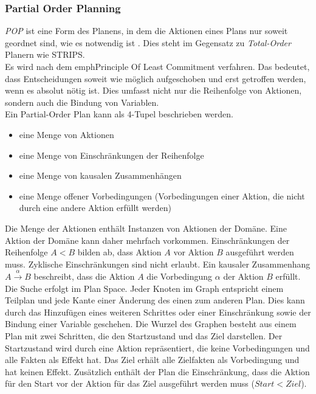 \subsubsection{Partial Order Planning}{\label{section:pop}}
\emph{\ac{POP}} ist eine Form des Planens, in dem die Aktionen eines Plans nur soweit geordnet sind, wie es notwendig ist \cite{dyer_2003}.
Dies steht im Gegensatz zu \emph{Total-Order} Planern wie \ac{STRIPS}.\\
Es wird nach dem emph{Principle Of Least Commitment} verfahren.
Das bedeutet, dass Entscheidungen soweit wie möglich aufgeschoben und erst getroffen werden, wenn es absolut nötig ist.
Dies umfasst nicht nur die Reihenfolge von Aktionen, sondern auch die Bindung von Variablen.\\
Ein Partial-Order Plan kann als 4-Tupel \cite{grastien} beschrieben werden.
\begin{itemize}
    \item eine Menge von Aktionen
    \item eine Menge von Einschränkungen der Reihenfolge
    \item eine Menge von kausalen Zusammenhängen
    \item eine Menge offener Vorbedingungen (Vorbedingungen einer Aktion, die nicht durch eine andere Aktion erfüllt werden)
\end{itemize}
Die Menge der Aktionen enthält Instanzen von Aktionen der Domäne.
Eine Aktion der Domäne kann daher mehrfach vorkommen.
Einschränkungen der Reihenfolge $A < B$ bilden ab, dass Aktion $A$ vor Aktion $B$ ausgeführt werden muss.
Zyklische Einschränkungen sind nicht erlaubt.
Ein kausaler Zusammenhang $A \xrightarrow{\alpha} B$ beschreibt, dass die Aktion $A$ die Vorbedingung $\alpha$ der Aktion $B$ erfüllt.\\
Die Suche erfolgt im Plan Space.
Jeder Knoten im Graph entspricht einem Teilplan und jede Kante einer Änderung des einen zum anderen Plan.
Dies kann durch das Hinzufügen eines weiteren Schrittes oder einer Einschränkung sowie der Bindung einer Variable geschehen.
Die Wurzel des Graphen besteht aus einem Plan mit zwei Schritten, die den Startzustand und das Ziel darstellen.
Der Startzustand wird durch eine Aktion repräsentiert, die keine Vorbedingungen und alle Fakten als Effekt hat.
Das Ziel erhält alle Zielfakten als Vorbedingung und hat keinen Effekt.
Zusätzlich enthält der Plan die Einschränkung, dass die Aktion für den Start vor der Aktion für das Ziel ausgeführt werden muss ($Start < Ziel$).\\
